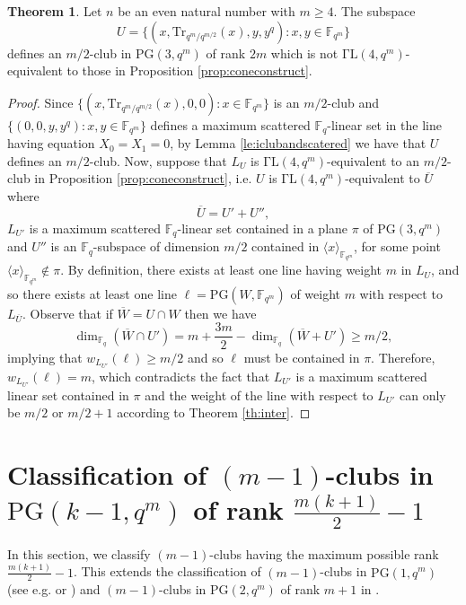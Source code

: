 \documentclass[11pt]{amsart}
\theoremstyle{definition}
\newtheorem{theorem}{Theorem}[section]
\newcommand{\fq}{{\mathbb F}_{q}}
\newcommand{\PG}{\mathrm{PG}}
\newcommand{\fqm}{\mathbb{F}_{q^m}}
\begin{document}
\begin{theorem}\label{thm:constrm/2-club}
    Let $n$ be an even natural number with $m\geq 4$.
    The subspace
    \[ U=\{(x,\mathrm{Tr}_{q^m/q^{m/2}}(x),y,y^q) \colon x,y \in \fqm \}\]
    defines an $m/2$-club in $\mathrm{PG}(3,q^m)$ of rank $2m$ which is not $\mathrm{\Gamma L}(4,q^m)$-equivalent to those in Proposition \ref{prop:coneconstruct}.
\end{theorem}
\begin{proof}
    Since $\{(x,\mathrm{Tr}_{q^m/q^{m/2}}(x),0,0) \colon x \in \fqm \}$ is an $m/2$-club and $\{(0,0,y,y^q) \colon x,y \in \fqm \}$ defines a maximum scattered $\fq$-linear set in the line having equation $X_0=X_1=0$, by Lemma \ref{le:iclubandscatered} we have that $U$ defines an $m/2$-club. Now, suppose that $L_U$ is $\mathrm{\Gamma L}(4,q^m)$-equivalent to an $m/2$-club in Proposition \ref{prop:coneconstruct}, i.e. $U$ is $\mathrm{\Gamma L}(4,q^m)$-equivalent to $\overline{U}$ where 
    $$\overline{U}=U'+U'',$$
    $L_{U'}$ is a maximum scattered $\fq$-linear set contained in a plane $\pi$ of $\mathrm{PG}(3,q^m)$ and $U''$ is an $\fq$-subspace of dimension $m/2$ contained in $\langle x\rangle_{\mathbb{F}_{q^m}}$, for some point $\langle x\rangle_{\mathbb{F}_{q^m}}\notin \pi$.
    By definition, there exists at least one line having weight $m$ in $L_U$, and so there exists at least one line $\ell=\mathrm{PG}(W,\fqm)$ of weight $m$ with respect to $L_{\overline{U}}$.
    Observe that if $\overline{W}=U\cap W$ then we have
    \[ \dim_{\fq}(\overline{W}\cap U')=m+\frac{3m}2-\dim_{\fq}(\overline{W}+ U')\geq m/2,\]
    implying that $w_{L_{U'}}(\ell) \geq m/2$ and so $\ell$ must be contained in $\pi$.
    Therefore, $w_{L_{U'}}(\ell)=m$, which contradicts the fact that $L_{U'}$ is a maximum scattered linear set contained in $\pi$ and the weight of the line with respect to $L_{U'}$ can only be $m/2$ or $m/2+1$ according to Theorem \ref{th:inter}.
\end{proof}
    
\section{Classification of $(m-1)$-clubs in $\PG(k-1,q^m)$ of rank $\frac{m(k+1)}{2}-1$}\label{sec:classm-1club}

In this section, we classify \((m-1)\)-clubs having the maximum possible rank \(\frac{m(k+1)}{2} - 1\). This extends the classification of $(m-1)$-clubs in $\mathrm{PG}(1,q^m)$ (see e.g. \cite[Theorem 3.7]{csajbok2018classes} or \cite[Theorem 2.3]{de2016linear}) and $(m-1)$-clubs in $\mathrm{PG}(2,q^m)$ of rank $m+1$ in \cite[Theorem 5]{lunardon2000blocking}.
\end{document}

